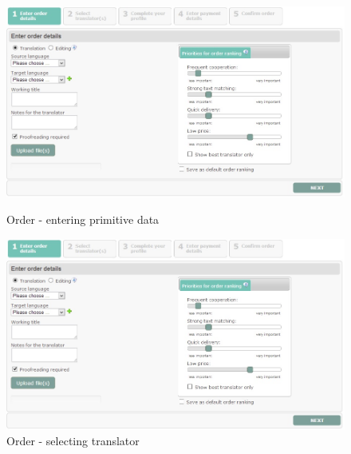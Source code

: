 \begin{figure}[h]
\begin{center}
\includegraphics[scale=\figurescaling]{figures/order-1.jpg}
\caption{Order - entering primitive data
\label{fig:order-1}}
\includegraphics[scale=\figurescaling]{figures/order-1.jpg}
\caption{Order - selecting translator
\label{fig:order-2}}
\end{center}
\end{figure}

